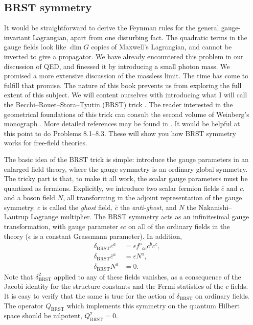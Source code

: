 \subsection{BRST symmetry}

It would be straightforward to derive the Feynman rules for the general
gauge-invariant Lagrangian, apart from one disturbing fact. The quadratic terms
in the gauge fields look like $\dim G$ copies of Maxwell's Lagrangian, and
cannot be inverted to give a propagator. We have already encountered this
problem in our discussion of QED, and finessed it by introducing a small photon
mass. We promised a more extensive discussion of the massless limit. The time
has come to fulfill that promise. The nature of this book prevents us from
exploring the full extent of this subject. We will content ourselves with
introducing what I will call the Becchi--Rouet--Stora--Tyutin (BRST) trick
\cite{banks-ref-46,banks-ref-47}. The reader interested in the geometrical foundations of this trick can
consult the second volume of Weinberg's monograph \cite{banks-ref-42}. More detailed
references may be found in \cite{banks-ref-48,banks-ref-49,banks-ref-50}. It would be helpful at this point to do
Problems 8.1--8.3. These will show you how BRST symmetry works for free-field
theories.


The basic idea of the BRST trick is simple: introduce the gauge parameters in
an enlarged field theory, where the gauge symmetry is an ordinary global
symmetry. The tricky part is that, to make it all work, the scalar gauge
parameters must be quantized as fermions. Explicitly, we introduce two scalar
fermion fields $\bar c$ and $c$, and a boson field $N$, all transforming in the
adjoint representation of the gauge symmetry. $c$ is called the \emph{ghost}
field, $\bar c$ the \emph{anti-ghost}, and $N$ the Nakanishi--Lautrup Lagrange
multiplier. The BRST symmetry acts as an infinitesimal gauge transformation,
with gauge parameter $\epsilon c$ on all of the ordinary fields in the theory
($\epsilon$ is a constant Grassmann parameter). In addition,
\begin{align*}
  \delta_{\mathrm{BRST}}c^a&=\epsilon f^a{}_{bc}c^bc^c,\\
  \delta_{\mathrm{BRST}}\bar c^a&=\epsilon N^a,\\
  \delta_{\mathrm{BRST}}N^a&=0.
\end{align*}
Note that $\delta_{\mathrm{BRST}}^2$ applied to any of these fields vanishes,
as a consequence of the Jacobi identity for the structure constants and the
Fermi statistics of the $c$ fields. It is easy to verify that the same is true
for the action of $\delta_{\mathrm{BRST}}$ on ordinary fields. The operator
$Q_{\mathrm{BRST}}$ which implements this symmetry on the quantum Hilbert space
should be nilpotent, $Q_{\mathrm{BRST}}^2=0$.

